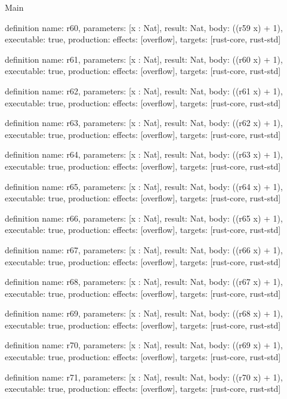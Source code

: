 \begin{lexlean}{Main}
\begin{semanticmodule}
definition{
  name: r60,
  parameters: [x : Nat],
  result: Nat,
  body: ((r59 x) + 1),
  executable: true,
  production: {effects: [overflow], targets: [rust-core, rust-std]}
}

definition{
  name: r61,
  parameters: [x : Nat],
  result: Nat,
  body: ((r60 x) + 1),
  executable: true,
  production: {effects: [overflow], targets: [rust-core, rust-std]}
}

definition{
  name: r62,
  parameters: [x : Nat],
  result: Nat,
  body: ((r61 x) + 1),
  executable: true,
  production: {effects: [overflow], targets: [rust-core, rust-std]}
}

definition{
  name: r63,
  parameters: [x : Nat],
  result: Nat,
  body: ((r62 x) + 1),
  executable: true,
  production: {effects: [overflow], targets: [rust-core, rust-std]}
}

definition{
  name: r64,
  parameters: [x : Nat],
  result: Nat,
  body: ((r63 x) + 1),
  executable: true,
  production: {effects: [overflow], targets: [rust-core, rust-std]}
}

definition{
  name: r65,
  parameters: [x : Nat],
  result: Nat,
  body: ((r64 x) + 1),
  executable: true,
  production: {effects: [overflow], targets: [rust-core, rust-std]}
}

definition{
  name: r66,
  parameters: [x : Nat],
  result: Nat,
  body: ((r65 x) + 1),
  executable: true,
  production: {effects: [overflow], targets: [rust-core, rust-std]}
}

definition{
  name: r67,
  parameters: [x : Nat],
  result: Nat,
  body: ((r66 x) + 1),
  executable: true,
  production: {effects: [overflow], targets: [rust-core, rust-std]}
}

definition{
  name: r68,
  parameters: [x : Nat],
  result: Nat,
  body: ((r67 x) + 1),
  executable: true,
  production: {effects: [overflow], targets: [rust-core, rust-std]}
}

definition{
  name: r69,
  parameters: [x : Nat],
  result: Nat,
  body: ((r68 x) + 1),
  executable: true,
  production: {effects: [overflow], targets: [rust-core, rust-std]}
}

definition{
  name: r70,
  parameters: [x : Nat],
  result: Nat,
  body: ((r69 x) + 1),
  executable: true,
  production: {effects: [overflow], targets: [rust-core, rust-std]}
}

definition{
  name: r71,
  parameters: [x : Nat],
  result: Nat,
  body: ((r70 x) + 1),
  executable: true,
  production: {effects: [overflow], targets: [rust-core, rust-std]}
}


\end{semanticmodule}
\end{lexlean}
